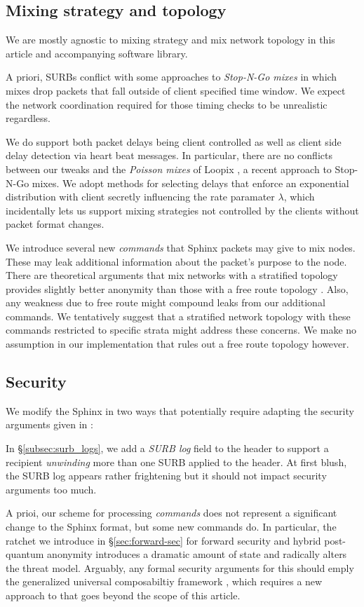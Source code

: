 \subsection{Mixing strategy and topology}

We are mostly agnostic to mixing strategy and mix network topology in
this article and accompanying software library.

A priori, SURBs conflict with some approaches to {\em Stop-N-Go mixes}
\cite{StopNGo} in which mixes drop packets that fall outside of client
specified time window.  We expect the network coordination required
for those timing checks to be unrealistic regardless. 

We do support both packet delays being client controlled as well as
client side delay detection via heart beat messages.  In particular,
there are no conflicts between our tweaks and the {\em Poisson mixes}
of Loopix \cite{Loopix}, a recent approach to Stop-N-Go mixes.
We adopt methods for selecting delays that enforce an exponential
distribution with client secretly influencing the rate paramater
$\lambda$, which incidentally lets us support mixing strategies not
controlled by the clients without packet format changes.

We introduce several new {\em commands} that Sphinx packets may give
to mix nodes.  These may leak additional information about the
packet's purpose to the node.  There are theoretical arguments that 
mix networks with a stratified topology provides slightly better
anonymity than those with a free route topology \cite{Diaz-??}.  
Also, any weakness due to free route might compound leaks from our
additional commands.  We tentatively suggest that a stratified
network topology with these commands restricted to specific strata
might address these concerns. %
We make no assumption in our implementation that rules out a free
route topology however.  

\subsection{Security}

We modify the Sphinx in two ways that potentially require adapting
the security arguments given in \cite{FormalOnion}: 

In \S\ref{subsec:surb_logs}, we add a {\em SURB log} field to the
header to support a recipient {\em unwinding} more than one SURB
applied to the header.  At first blush, the SURB log appears rather
frightening but it should not impact security arguments too much.

A prioi, our scheme for processing {\em commands} does not represent
a significant change to the Sphinx format, but some new commands do.
In particular, the ratchet we introduce in \S\ref{sec:forward-sec}
for forward security and hybrid post-quantum anonymity introduces a
dramatic amount of state and radically alters the threat model.
Arguably, any formal security arguments for this should emply the 
generalized universal composabiltiy framework \cite{GenUC}, which
requires a new approach to \cite{FormalOnion} that goes beyond the
scope of this article. 



